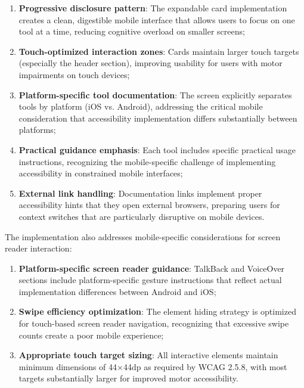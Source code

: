 \begin{enumerate}
    \item \textbf{Progressive disclosure pattern}: The expandable card implementation creates a clean, digestible mobile interface that allows users to focus on one tool at a time, reducing cognitive overload on smaller screens;
    
    \item \textbf{Touch-optimized interaction zones}: Cards maintain larger touch targets (especially the header section), improving usability for users with motor impairments on touch devices;
    
    \item \textbf{Platform-specific tool documentation}: The screen explicitly separates tools by platform (iOS vs. Android), addressing the critical mobile consideration that accessibility implementation differs substantially between platforms;
    
    \item \textbf{Practical guidance emphasis}: Each tool includes specific practical usage instructions, recognizing the mobile-specific challenge of implementing accessibility in constrained mobile interfaces;
    
    \item \textbf{External link handling}: Documentation links implement proper accessibility hints that they open external browsers, preparing users for context switches that are particularly disruptive on mobile devices.
\end{enumerate}

The implementation also addresses mobile-specific considerations for screen reader interaction:

\begin{enumerate}
    \item \textbf{Platform-specific screen reader guidance}: TalkBack and VoiceOver sections include platform-specific gesture instructions that reflect actual implementation differences between Android and iOS;
    
    \item \textbf{Swipe efficiency optimization}: The element hiding strategy is optimized for touch-based screen reader navigation, recognizing that excessive swipe counts create a poor mobile experience;
    
    \item \textbf{Appropriate touch target sizing}: All interactive elements maintain minimum dimensions of 44×44dp as required by WCAG 2.5.8, with most targets substantially larger for improved motor accessibility.
\end{enumerate}

